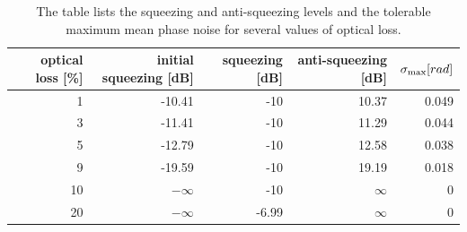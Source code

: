 \begin{table}
\begin{center}
\begin{tabular}{rrrrr}
\hline
optical loss [\%]& initial squeezing [dB] & squeezing [dB] & anti-squeezing [dB] & $\sigma_{\rm max} [rad]$ \\
\hline
1 & -10.41 & -10 & 10.37 & 0.049\\
3 & -11.41 & -10 & 11.29 & 0.044\\
5 & -12.79 & -10 & 12.58 & 0.038\\
9 & -19.59 & -10 & 19.19& 0.018 \\
10 & $-\infty$ & -10 & $\infty$ & 0\\
20 & $-\infty$ & -6.99 & $\infty$ & 0\\
\hline
\end{tabular}
\end{center}
\caption{The table lists  the squeezing and anti-squeezing levels and the tolerable maximum mean phase noise for several values of optical loss.}
\label{tab:phsnoiselimit}
\end{table}

\FloatBarrier



